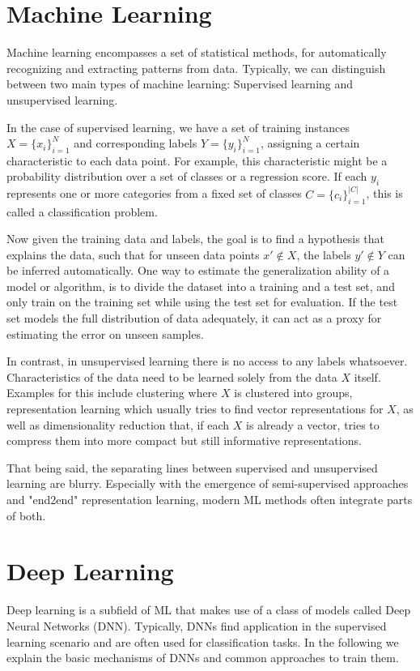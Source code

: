 \section{Machine Learning}
Machine learning encompasses a set of statistical methods, for automatically recognizing and extracting patterns from data. Typically, we can distinguish between two main types of machine learning: Supervised learning and unsupervised learning.

In the case of supervised learning, we have a set of training instances $X = \{x_i\}_{i=1}^N$ and corresponding labels $Y = \{y_i\}_{i=1}^N$, assigning a certain characteristic to each data point. For example, this characteristic might be a probability distribution over a set of classes or a regression score. If each $y_i$ represents one or more categories from a fixed set of classes $C = \{c_i\}_{i=1}^{|C|}$, this is called a classification problem.

Now given the training data and labels, the goal is to find a hypothesis that explains the data, such that for unseen data points $x' \notin X$, the labels $y' \notin Y$ can be inferred automatically. One way to estimate the generalization ability of a model or algorithm, is to divide the dataset into a training and a test set, and only train on the training set while using the test set for evaluation. If the test set models the full distribution of data adequately, it can act as a proxy for estimating the error on unseen samples.

In contrast, in unsupervised learning there is no access to any labels whatsoever. Characteristics of the data need to be learned solely from the data $X$ itself. Examples for this include clustering where $X$ is clustered into groups, representation learning which usually tries to find vector representations for $X$, as well as dimensionality reduction that, if each $X$ is already a vector, tries to compress them into more compact but still informative representations.

That being said, the separating lines between supervised and unsupervised learning are blurry. Especially with the emergence of semi-supervised approaches and "end2end" representation learning, modern ML methods often integrate parts of both.

\section{Deep Learning}
Deep learning is a subfield of ML that makes use of a class of models called Deep Neural Networks (DNN). Typically, DNNs find application in the supervised learning scenario and are often used for classification tasks. In the following we explain the basic mechanisms of DNNs and common approaches to train them.

